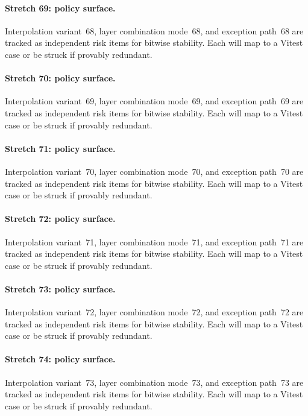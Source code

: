 \documentclass[sigconf,nonacm]{acmart}
\begin{document}
\paragraph{Stretch 69: policy surface.}
Interpolation variant~68, layer combination mode~68, and exception path~68 are tracked as independent risk items for bitwise stability. Each will map to a Vitest case or be struck if provably redundant. %

\paragraph{Stretch 70: policy surface.}
Interpolation variant~69, layer combination mode~69, and exception path~69 are tracked as independent risk items for bitwise stability. Each will map to a Vitest case or be struck if provably redundant. %

\paragraph{Stretch 71: policy surface.}
Interpolation variant~70, layer combination mode~70, and exception path~70 are tracked as independent risk items for bitwise stability. Each will map to a Vitest case or be struck if provably redundant. %

\paragraph{Stretch 72: policy surface.}
Interpolation variant~71, layer combination mode~71, and exception path~71 are tracked as independent risk items for bitwise stability. Each will map to a Vitest case or be struck if provably redundant. %

\paragraph{Stretch 73: policy surface.}
Interpolation variant~72, layer combination mode~72, and exception path~72 are tracked as independent risk items for bitwise stability. Each will map to a Vitest case or be struck if provably redundant. %

\paragraph{Stretch 74: policy surface.}
Interpolation variant~73, layer combination mode~73, and exception path~73 are tracked as independent risk items for bitwise stability. Each will map to a Vitest case or be struck if provably redundant. %
\end{document}
